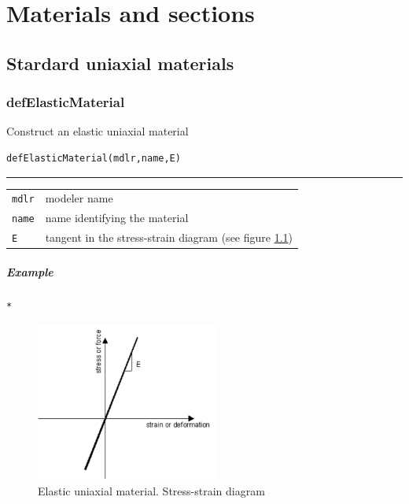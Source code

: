 \chapter{Materials and sections}
\section{Stardard uniaxial materials}
\subsection{defElasticMaterial} 
\noindent Construct an elastic uniaxial material
\begin{verbatim}
defElasticMaterial(mdlr,name,E)
\end{verbatim}
\vspace{-10pt}
{\color{grayLines} \rule{\linewidth}{0.25pt}}
\begin{center}
\begin{tabular}{lp{10cm}}
{\tt mdlr} & modeler name \\
{\tt name} & name identifying the material \\
{\tt E} & tangent in the stress-strain diagram (see figure \ref{Elastic}) \\
\end{tabular}
\end{center}
\paragraph{Example}
\begin{verbatim}
*
\end{verbatim}

\begin{figure}[h]
\centering
\includegraphics[width=60mm]{materials/figures/Elastic}
\caption{Elastic uniaxial material. Stress-strain diagram}\label{Elastic}
\end{figure}

